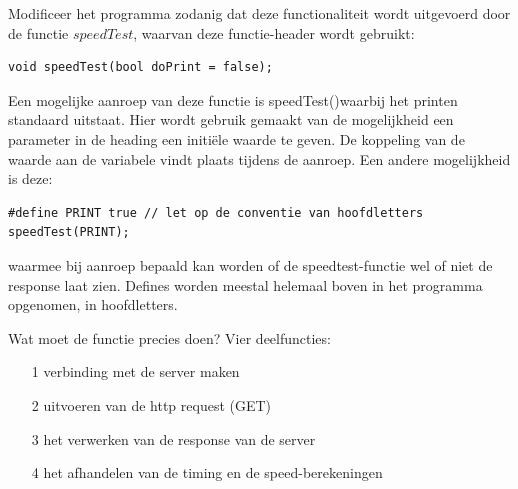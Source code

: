 \begin{exercise}
Modificeer het programma zodanig dat deze functionaliteit wordt uitgevoerd door de functie $speedTest$, waarvan deze functie-header wordt gebruikt:

\begin{lstlisting}[language=Arduino, numbers=none]
void speedTest(bool doPrint = false);
\end{lstlisting}
Een mogelijke aanroep van deze functie is speedTest()waarbij het printen standaard uitstaat. Hier wordt gebruik gemaakt van de mogelijkheid een parameter in de heading een initiële waarde te geven. De koppeling van de waarde aan de variabele vindt plaats tijdens de aanroep. Een andere mogelijkheid is deze:
\begin{lstlisting}[language=Arduino, numbers=none]
#define PRINT true // let op de conventie van hoofdletters 
speedTest(PRINT);
\end{lstlisting}
waarmee bij aanroep bepaald kan worden of de speedtest-functie wel of niet de response laat zien. Defines worden meestal helemaal boven in het programma opgenomen, in hoofdletters. 

Wat moet de functie precies doen? Vier deelfuncties: 
\begin{enumerate}
  \item[1] verbinding met de server maken
  \item[2] uitvoeren van de http request (GET)
  \item[3] het verwerken van de response van de server
  \item[4] het afhandelen van de timing en de speed-berekeningen
\end{enumerate}
\end{exercise}

